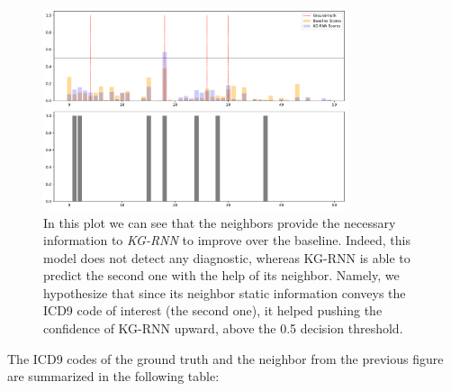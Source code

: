 \begin{figure}[H]
 \centering
 \includegraphics[width=0.8\textwidth]{figures/preds-0.pdf}
 \caption{In this plot we can see that the neighbors provide the necessary information to \emph{KG-RNN} to improve over the baseline. Indeed, this model does not detect any diagnostic, whereas KG-RNN is able to predict the second one with the help of its neighbor. Namely, we hypothesize that since its neighbor static information conveys the ICD9 code of interest (the second one), it helped pushing the confidence of KG-RNN upward, above the 0.5 decision threshold.}
\end{figure}

\newpage
The ICD9 codes of the ground truth and the neighbor from the previous figure are summarized in the following table:

